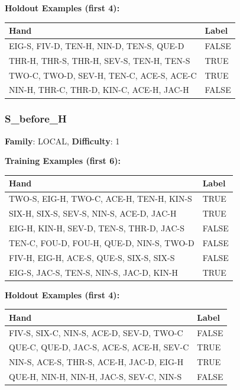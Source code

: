 \documentclass[10pt,a4paper]{article}
\begin{document}
\textbf{Holdout Examples (first 4):}

\begin{small}
\begin{tabular}{p{8cm}l}
\toprule
Hand & Label \\
\midrule
EIG-S, FIV-D, TEN-H, NIN-D, TEN-S, QUE-D & \textcolor{negative}{FALSE} \\
THR-H, THR-S, THR-H, SEV-S, TEN-H, TEN-S & \textcolor{positive}{TRUE} \\
TWO-C, TWO-D, SEV-H, TEN-C, ACE-S, ACE-C & \textcolor{positive}{TRUE} \\
NIN-H, THR-C, THR-D, KIN-C, ACE-H, JAC-H & \textcolor{negative}{FALSE} \\
\bottomrule
\end{tabular}
\end{small}

\vspace{0.5cm}

\subsubsection{S\_before\_H}

\textbf{Family}: LOCAL, \textbf{Difficulty}: 1

\textbf{Training Examples (first 6):}

\begin{small}
\begin{tabular}{p{8cm}l}
\toprule
Hand & Label \\
\midrule
TWO-S, EIG-H, TWO-C, ACE-H, TEN-H, KIN-S & \textcolor{positive}{TRUE} \\
SIX-H, SIX-S, SEV-S, NIN-S, ACE-D, JAC-H & \textcolor{positive}{TRUE} \\
EIG-H, KIN-H, SEV-D, TEN-S, THR-D, JAC-S & \textcolor{negative}{FALSE} \\
TEN-C, FOU-D, FOU-H, QUE-D, NIN-S, TWO-D & \textcolor{negative}{FALSE} \\
FIV-H, EIG-H, ACE-S, QUE-S, SIX-S, SIX-S & \textcolor{negative}{FALSE} \\
EIG-S, JAC-S, TEN-S, NIN-S, JAC-D, KIN-H & \textcolor{positive}{TRUE} \\
\bottomrule
\end{tabular}
\end{small}

\textbf{Holdout Examples (first 4):}

\begin{small}
\begin{tabular}{p{8cm}l}
\toprule
Hand & Label \\
\midrule
FIV-S, SIX-C, NIN-S, ACE-D, SEV-D, TWO-C & \textcolor{negative}{FALSE} \\
QUE-C, QUE-D, JAC-S, ACE-S, ACE-H, SEV-C & \textcolor{positive}{TRUE} \\
NIN-S, ACE-S, THR-S, ACE-H, JAC-D, EIG-H & \textcolor{positive}{TRUE} \\
QUE-H, NIN-H, NIN-H, JAC-S, SEV-C, NIN-S & \textcolor{negative}{FALSE} \\
\bottomrule
\end{tabular}
\end{small}
\end{document}
